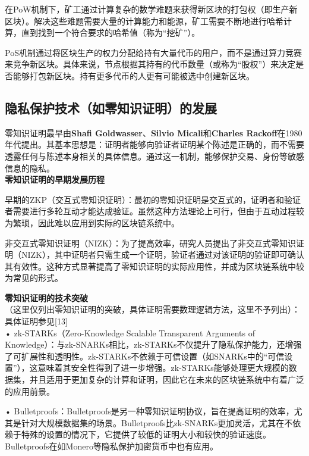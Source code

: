 在PoW机制下，矿工通过计算复杂的数学难题来获得新区块的打包权（即生产新区块）。解决这些难题需要大量的计算能力和能源，矿工需要不断地进行哈希计算，直到找到一个符合要求的哈希值（称为“挖矿”）。

PoS机制通过将区块生产的权力分配给持有大量代币的用户，而不是通过算力竞赛来竞争新区块。具体来说，节点根据其持有的代币数量（或称为“股权”）来决定是否能够打包新区块。持有更多代币的人更有可能被选中创建新区块。

\subsection{隐私保护技术（如零知识证明）的发展}

零知识证明最早由\textbf{Shafi Goldwasser}、\textbf{Silvio Micali}和\textbf{Charles Rackoff}在1980年代提出。其基本思想是：证明者能够向验证者证明某个陈述是正确的，而不需要透露任何与陈述本身相关的具体信息。通过这一机制，能够保护交易、身份等敏感信息的隐私。 \\

\textbf{零知识证明的早期发展历程}

早期的ZKP（交互式零知识证明）：最初的零知识证明是交互式的，证明者和验证者需要进行多轮互动才能达成验证。虽然这种方法理论上可行，但由于互动过程较为繁琐，因此难以应用到实际的区块链系统中。

非交互式零知识证明（NIZK）：为了提高效率，研究人员提出了非交互式零知识证明（NIZK），其中证明者只需生成一个证明，验证者通过对该证明的验证即可确认其有效性。这种方式显著提高了零知识证明的实际应用性，并成为区块链系统中较为常见的形式。

\textbf{零知识证明的技术突破} \\
（这里仅列出零知识证明的突破，具体证明需要数理逻辑方法，这里不予列出）：具体证明参见[13]  \\

•  zk-STARKs（Zero-Knowledge Scalable Transparent Arguments of Knowledge）：与zk-SNARKs相比，zk-STARKs不仅提升了隐私保护能力，还增强了可扩展性和透明性。zk-STARKs不依赖于可信设置（如SNARKs中的“可信设置”），这意味着其安全性得到了进一步增强。zk-STARKs能够处理更大规模的数据集，并且适用于更加复杂的计算和证明，因此它在未来的区块链系统中有着广泛的应用前景。

•  Bulletproofs：Bulletproofs是另一种零知识证明协议，旨在提高证明的效率，尤其是针对大规模数据集的场景。Bulletproofs比zk-SNARKs更加灵活，尤其在不依赖于特殊的设置的情况下，它提供了较低的证明大小和较快的验证速度。Bulletproofs在如Monero等隐私保护加密货币中也有应用。




